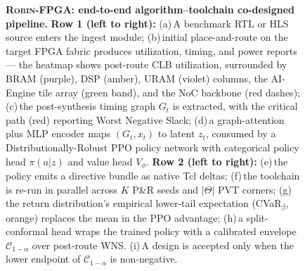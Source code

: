 \documentclass[journal,onecolumn=false]{IEEEtran}
\begin{document}
\begin{figure}[t]
\caption{\textbf{\textsc{Robin-FPGA}: end-to-end algorithm--toolchain co-designed pipeline.}
\textbf{Row 1 (left to right):} (a)\,A benchmark RTL or HLS source enters the ingest module; (b)\,initial place-and-route on the target FPGA fabric produces utilization, timing, and power reports — the heatmap shows post-route CLB utilization, surrounded by BRAM (purple), DSP (amber), URAM (violet) columns, the AI-Engine tile array (green band), and the NoC backbone (red dashes); (c)\,the post-synthesis timing graph $G_t$ is extracted, with the critical path (red) reporting Worst Negative Slack; (d)\,a graph-attention plus MLP encoder maps $(G_t,x_t)$ to latent $z_t$, consumed by a Distributionally-Robust PPO policy network with categorical policy head $\pi(a|z)$ and value head $V_\phi$.
\textbf{Row 2 (left to right):} (e)\,the policy emits a directive bundle as native Tcl deltas; (f)\,the toolchain is re-run in parallel across $K$ P\&R seeds and $|\Theta|$ PVT corners; (g)\,the return distribution's empirical lower-tail expectation (CVaR$_\beta$, orange) replaces the mean in the PPO advantage; (h)\,a split-conformal head wraps the trained policy with a calibrated envelope $\mathcal{C}_{1-\alpha}$ over post-route WNS.
(i)\,A design is accepted only when the lower endpoint of $\mathcal{C}_{1-\alpha}$ is non-negative.}
\label{fig:cover}
\end{figure}
\end{document}
